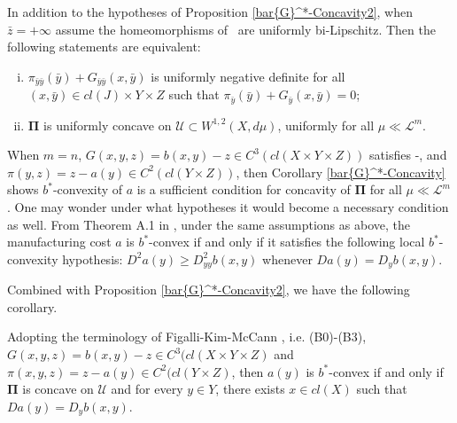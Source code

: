 \begin{remark}\label{R:B2}
	In addition to the hypotheses of Proposition \ref{bar{G}^*-Concavity2}, when
	$\bar{z}=+\infty$ assume the homeomorphisms of \Gone\ are uniformly bi-Lipschitz. Then
	the following statements are equivalent:
	\begin{enumerate}[(i)]
		\item $\pi_{\bar{y}\bar{y}}(\bar{y}) + G_{\bar{y}\bar{y}}(x, \bar{y})$ is  uniformly negative definite 
		for all $(x, \bar{y}) \in cl(J)\times Y \times Z$ such that $\pi_{\bar{y}}(\bar{y}) + G_{\bar{y}}(x, \bar{y})=0$;
		\item $\pmb \Pi$ is uniformly concave  on $\mathcal{U} \subset W^{1,2}(X,d\mu)$, uniformly for all $\mu\ll \mathcal{L}^m$.
	\end{enumerate}
\end{remark}



When $m=n$, $G(x,y,z)= b(x,y)-z \in C^3(cl(X\times Y \times Z)
)$ satisfies \Gzero-\Geight,  and $\pi(y,z)=z-a(y) \in C^2( cl( Y \times Z)
)$, then Corollary \ref{bar{G}^*-Concavity} shows $b^*$-convexity of $a$ is a sufficient condition for
concavity of $\pmb \Pi$  for all $\mu\ll \mathcal{L}^m$. One may wonder under what hypotheses it would become a necessary condition as well. From Theorem A.1 in \cite{KimMcCann10}, under the same assumptions as above, the manufacturing cost $a$ is $b^*$-convex if and only if it satisfies the following local $b^*$-convexity hypothesis: $D^2a(y)\ge D^2_{yy}b(x,y)$ whenever $Da(y) = D_{y}b(x,y)$. 
\medskip

Combined with Proposition \ref{bar{G}^*-Concavity2}, we have the following corollary.
\medskip

\begin{corollary}
	Adopting the terminology of Figalli-Kim-McCann \cite{FigalliKimMcCann11},  i.e. (B0)-(B3), $G(x,y,z) = b(x,y)- z \in C^3(cl(X\times Y \times Z)$ and 
	$\pi(x,y,z) = z -a(y) \in C^2( cl( Y \times Z)$, then $a(y)$ is $b^*$-convex if  and only if $\mathbf \Pi$ is concave on $\mathcal U$ and for every $y \in Y$, there exists $x \in cl(X)$ such that $Da(y) = D_y b(x,y)$.
\end{corollary}

